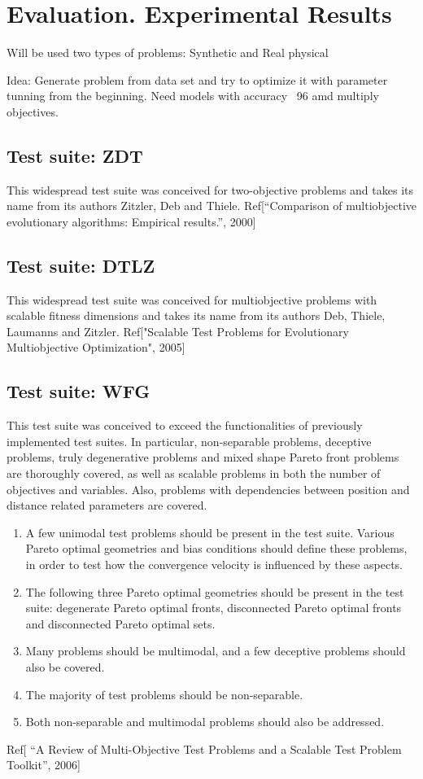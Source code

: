 \chapter{Evaluation. Experimental Results}

Will be used two types of problems: Synthetic and Real physical

Idea: Generate problem from data set and try to optimize it with parameter tunning from the beginning. 
Need models with accuracy ~96 amd multiply objectives. 

\section{Test suite: ZDT}
This widespread test suite was conceived for two-objective problems and takes its name from its authors Zitzler, Deb and Thiele.
Ref[“Comparison of multiobjective evolutionary algorithms: Empirical results.”, 2000]

\section{Test suite: DTLZ}
This widespread test suite was conceived for multiobjective problems with scalable fitness dimensions and takes its name from its authors Deb, Thiele, Laumanns and Zitzler.
Ref["Scalable Test Problems for Evolutionary Multiobjective Optimization", 2005]

\section{Test suite: WFG}
This test suite was conceived to exceed the functionalities of previously implemented test suites.
In particular, non-separable problems, deceptive problems, truly degenerative problems and mixed shape Pareto front problems are thoroughly covered, 
as well as scalable problems in both the number of objectives and variables. Also, problems with dependencies between position and distance related parameters are covered.
    \begin{enumerate}

        \item A few unimodal test problems should be present in the test suite. 
        Various Pareto optimal geometries and bias conditions should define these problems, 
        in order to test how the convergence velocity is influenced by these aspects.

        \item The following three Pareto optimal geometries should be present in the test suite: 
        degenerate Pareto optimal fronts, disconnected Pareto optimal fronts and disconnected Pareto optimal sets.

        \item Many problems should be multimodal, and a few deceptive problems should also be covered.
        \item The majority of test problems should be non-separable.
        \item Both non-separable and multimodal problems should also be addressed.
    \end{enumerate}
Ref[ “A Review of Multi-Objective Test Problems and a Scalable Test Problem Toolkit”, 2006]

